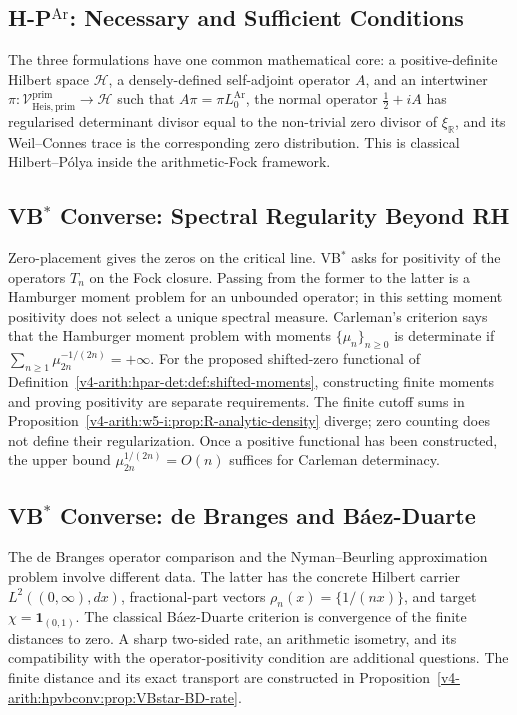 \subsection{H-P\(^{\mathrm{Ar}}\): Necessary and Sufficient Conditions}
\label{v4-arith:hpvbconv:cycle-4}

The three formulations have one common mathematical core: a
positive-definite Hilbert space \(\mathcal{H}\), a densely-defined
self-adjoint operator \(A\), and an intertwiner
\(\pi:\mathcal{V}^{\mathrm{prim}}_{\mathrm{Heis},\mathrm{prim}}\to\mathcal{H}\)
such that \(A\pi=\pi L_{0}^{\mathrm{Ar}}\), the normal operator
\(\tfrac12+iA\) has regularised determinant divisor equal to the
non-trivial zero divisor of \(\xi_{\mathbb R}\), and its
Weil--Connes trace is the corresponding zero distribution. This is
classical Hilbert--P\'olya inside the arithmetic-Fock framework.

\subsection{VB\(^{*}\) Converse: Spectral Regularity Beyond RH}
\label{v4-arith:hpvbconv:cycle-5}

Zero-placement gives the zeros on the critical line. VB\(^{*}\) asks
for positivity of the operators \(T_{n}\) on the Fock closure. Passing
from the former to the latter is a Hamburger moment problem for an
unbounded operator; in this setting moment positivity does not select
a unique spectral measure. Carleman's criterion says that the
Hamburger
moment problem with moments \(\{\mu_{n}\}_{n\geq 0}\) is determinate if
\(\sum_{n\geq 1}\mu_{2n}^{-1/(2n)}=+\infty\). For the proposed shifted-zero functional of
Definition~\ref{v4-arith:hpar-det:def:shifted-moments}, constructing
finite moments and proving positivity are separate requirements.
The finite cutoff sums in
Proposition~\ref{v4-arith:w5-i:prop:R-analytic-density} diverge;
zero counting does not define their regularization. Once a positive
functional has been constructed, the upper bound
\(\mu_{2n}^{1/(2n)}=O(n)\) suffices for Carleman determinacy.

\subsection{VB\(^{*}\) Converse: de Branges and B\'aez-Duarte}
\label{v4-arith:hpvbconv:cycle-6}

The de Branges operator comparison and the Nyman--Beurling
approximation problem involve different data. The latter has the
concrete Hilbert carrier \(L^2((0,\infty),dx)\), fractional-part
vectors \(\rho_n(x)=\{1/(nx)\}\), and target
\(\chi=\mathbf1_{(0,1)}\). The classical B\'aez-Duarte criterion
is convergence of the finite distances to zero. A sharp two-sided
rate, an arithmetic isometry, and its compatibility with the
operator-positivity condition are additional questions. The finite
distance and its exact transport are constructed in
Proposition~\ref{v4-arith:hpvbconv:prop:VBstar-BD-rate}.

